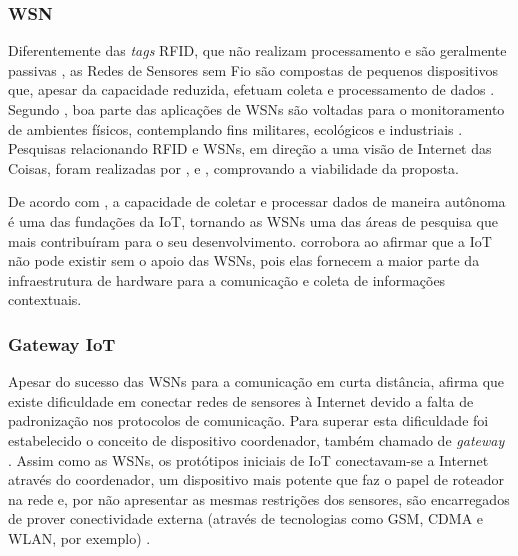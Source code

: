 \documentclass[twoside,english,brazilian]{UNISINOSmonografia}
\begin{document}
\subsubsection{WSN}
	Diferentemente das \textit{tags} RFID, que não realizam processamento e 
	são geralmente passivas \cite{Atzori2010b}, as Redes de Sensores sem Fio 
	são compostas de pequenos dispositivos que, apesar da capacidade reduzida, 
	efetuam coleta e processamento de dados \cite{Sakthidharan2012}. Segundo 
	, boa parte das aplicações de WSNs são voltadas para 
	o monitoramento de ambientes físicos, contemplando fins militares, 
	ecológicos e industriais \cite{Suhonen2012}. Pesquisas relacionando RFID e 
	WSNs, em direção a uma visão de Internet das Coisas, foram realizadas por 
	,  e , 
	comprovando a viabilidade da proposta.
	
	De acordo com , a capacidade de coletar e processar 
	dados de maneira autônoma é uma das fundações da IoT, tornando as WSNs uma 
	das áreas de pesquisa que mais contribuíram para o seu desenvolvimento. 
	 corrobora ao afirmar que a IoT não pode existir sem 
	o apoio das WSNs, pois elas fornecem a maior parte da infraestrutura de 
	hardware para a comunicação e coleta de informações contextuais.
\subsubsection{Gateway IoT}
	
	Apesar do sucesso das WSNs para a comunicação em curta distância, 
	 afirma que existe dificuldade 
	em conectar redes de sensores à Internet devido a falta de padronização 
	nos protocolos de comunicação. Para superar esta dificuldade foi 
	estabelecido o conceito de dispositivo coordenador, também chamado de 
	\textit{gateway} \cite{Steenkamp2009}. 
	Assim como as WSNs, os protótipos iniciais de IoT conectavam-se a Internet 
	através do coordenador, um dispositivo mais potente que faz o papel de 
	roteador na rede \cite{Kuryla2010} e, por não apresentar as mesmas 
	restrições dos sensores, são encarregados de prover 
	conectividade externa (através de 
	tecnologias como GSM, CDMA e WLAN, por exemplo) \cite{Liu2012}.
	
\end{document}
